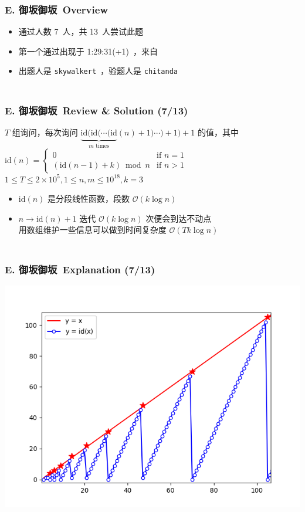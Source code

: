 \documentclass[notheorems]{beamer}
\newcommand{\zhProbE}{御坂御坂}			\newcommand{\DiffE}{Medium}	\newcommand{\AuthProbE}{\texttt{skywalkert}}	\newcommand{\TestProbE}{\texttt{chitanda}}
\newcommand{\AccInProbE}{7}	\newcommand{\SubInProbE}{13}	\newcommand{\RatInProbE}{53.85\%}
\newcommand{\FirPenInProbE}{1:29:31(+1)}	\newcommand{\FirPerInProbE}{\Someone}
\begin{document}
\begin{frame}[label = ProbE]
\frametitle{\\ E. \zhProbE\ Overview}
\begin{spacing}{2.0} \large
\begin{itemize}
\item 通过人数 \AccInProbE\ 人，共 \SubInProbE\ 人尝试此题
\item 第一个通过出现于 \FirPenInProbE\ ，来自 \FirPerInProbE\ 
\item 出题人是 \AuthProbE\ ，验题人是 \TestProbE\
\end{itemize}
\end{spacing}
\end{frame}
\begin{frame}
\frametitle{\\ E. \zhProbE\ Review \& Solution (\AccInProbE/\SubInProbE)}
\begin{spacing}{2.0} \large
$T$ 组询问，每次询问 $\underbrace{\mathrm{id}(\mathrm{id}(\cdots(\mathrm{id}}_{m\text{ times}}(n) + 1)\cdots) + 1) + 1$ 的值，其中 $\mathrm{id}(n) = \begin{cases}0&\text{if }n = 1 \\ (\mathrm{id}(n - 1) + k) \bmod n&\text{if }n > 1\end{cases}$
\\ $1 \leq T \leq 2 \times 10^5, 1 \leq n, m \leq 10^{18}, k = 3$ \pause
\begin{itemize}[<+->]
\item $\mathrm{id}(n)$ 是分段线性函数，段数 $\mathcal{O}(k \log n)$
\item $n \to \mathrm{id}(n) + 1$ 迭代 $\mathcal{O}(k \log n)$ 次便会到达不动点
\\ 用数组维护一些信息可以做到时间复杂度 $\mathcal{O}(T k \log n)$
\end{itemize}
\end{spacing}
\end{frame}
\begin{frame}
\frametitle{\\ E. \zhProbE\ Explanation (\AccInProbE/\SubInProbE)}
\begin{center}
\includegraphics[scale=0.6]{E.png}
\end{center}
\end{frame}
\end{document}

